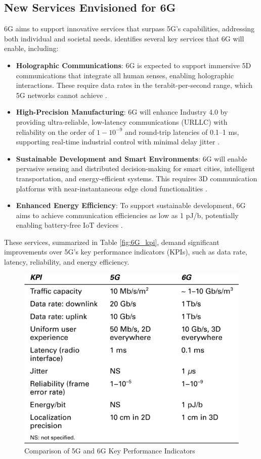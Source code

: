 \documentclass[acmtog]{acmart}
\begin{document}
\subsection{New Services Envisioned for 6G}

6G aims to support innovative services that surpass 5G's capabilities, addressing both individual and societal needs. \citet{ref4} identifies several key services that 6G will enable, including:

\begin{itemize}
  \item \textbf{Holographic Communications}: 6G is expected to support immersive 5D communications that integrate all human senses, enabling holographic interactions. These require data rates in the terabit-per-second range, which 5G networks cannot achieve \citep{ref4_1}.
  \item \textbf{High-Precision Manufacturing}: 6G will enhance Industry 4.0 by providing ultra-reliable, low-latency communications (URLLC) with reliability on the order of $1-10^{-9}$ and round-trip latencies of 0.1--1 ms, supporting real-time industrial control with minimal delay jitter \citep{ref4_2}.
  \item \textbf{Sustainable Development and Smart Environments}: 6G will enable pervasive sensing and distributed decision-making for smart cities, intelligent transportation, and energy-efficient systems. This requires 3D communication platforms with near-instantaneous edge cloud functionalities \citep{ref4}.
  \item \textbf{Enhanced Energy Efficiency}: To support sustainable development, 6G aims to achieve communication efficiencies as low as 1 pJ/b, potentially enabling battery-free IoT devices \citep{ref4_3}.
\end{itemize}

These services, summarized in Table \ref{fig:6G_kpi}, demand significant improvements over 5G's key performance indicators (KPIs), such as data rate, latency, reliability, and energy efficiency.

\begin{figure}[h]
  \centering
  \includegraphics[width=\linewidth]{6G_kpi.png}
  \caption{Comparison of 5G and 6G Key Performance Indicators \cite{ref4}}
\end{figure}
\end{document}
